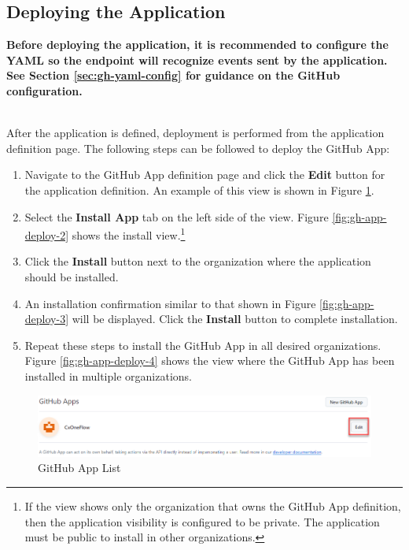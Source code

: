 \FloatBarrier

\subsection{Deploying the Application}

\textbf{Before deploying the application, it is recommended to configure the \cxoneflow YAML
so the endpoint will recognize events sent by the application.  See Section \ref{sec:gh-yaml-config} for guidance on the \cxoneflow
GitHub configuration.}

\noindent\\After the application is defined, deployment is performed from the application
definition page. The following steps can be followed to deploy the \cxoneflow GitHub App:

\begin{enumerate}
    \item Navigate to the GitHub App definition page and click the \textbf{Edit} button for the \cxoneflow
    application definition.  An example of this view is shown in Figure \ref{fig:gh-app-deploy-1}.
    \item Select the \textbf{Install App} tab on the left side of the view.  Figure \ref{fig:gh-app-deploy-2}
    shows the install view.\footnote{If the view shows only the organization that owns the \cxoneflow GitHub App definition,
    then the application visibility is configured to be private.  The application must be public to install in other organizations.}
    \item Click the \textbf{Install} button next to the organization where the application should be installed.
    \item An installation confirmation similar to that shown in Figure \ref{fig:gh-app-deploy-3} will be displayed.
    Click the \textbf{Install} button to complete installation.
    \item Repeat these steps to install the \cxoneflow GitHub App in all desired organizations.  Figure \ref{fig:gh-app-deploy-4}
    shows the view where the GitHub App has been installed in multiple organizations.
\end{enumerate}

\begin{figure}[ht]
    \includegraphics[width=\textwidth]{graphics/gh-app-deploy-1.png}
    \caption{GitHub App List}
    \label{fig:gh-app-deploy-1}
\end{figure}

